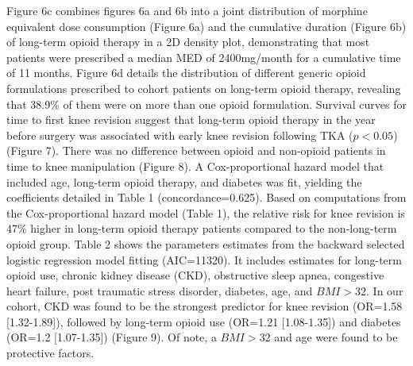\documentclass[a4paper]{article}
\begin{document}
 Figure 6c combines figures 6a and 6b into a joint distribution of morphine equivalent dose consumption (Figure 6a) and the cumulative duration (Figure 6b) of long-term opioid therapy in a 2D density plot, demonstrating that most patients were prescribed a median MED of 2400mg/month for a cumulative time of 11 months. Figure 6d details the distribution of different generic opioid formulations prescribed to cohort patients on long-term opioid therapy, revealing that 38.9\% of them were on more than one opioid formulation.
Survival curves for time to first knee revision suggest that long-term opioid therapy in the year before surgery was associated with early knee revision following TKA ($p<0.05$) (Figure 7). There was no difference between opioid and non-opioid patients in time to knee manipulation (Figure 8). A Cox-proportional hazard model that included age, long-term opioid therapy, and diabetes was fit, yielding the coefficients detailed in Table 1 (concordance=0.625). Based on computations from the Cox-proportional hazard model (Table 1), the relative risk for knee revision is 47\% higher in long-term opioid therapy patients compared to the non-long-term opioid group.  
Table 2 shows the parameters estimates  from the backward selected logistic regression model fitting (AIC=11320). It includes estimates for long-term opioid use, chronic kidney disease (CKD), obstructive sleep apnea, congestive heart failure, post traumatic stress disorder, diabetes, age, and $BMI >32$. In our cohort, CKD was found to be the strongest predictor for knee revision (OR=1.58 [1.32-1.89]), followed by long-term opioid use (OR=1.21 [1.08-1.35]) and diabetes (OR=1.2 [1.07-1.35]) (Figure 9). Of note, a $BMI>32$ and age were found to be protective factors.
\end{document}
